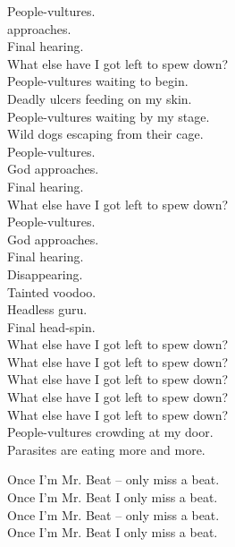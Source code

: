 


People-vultures. \\
 approaches. \\
Final hearing. \\
What else have I got left to spew down? \\

People-vultures waiting to begin. \\
Deadly ulcers feeding on my skin. \\

People-vultures waiting by my stage. \\
Wild dogs escaping from their cage. \\

People-vultures. \\
God approaches. \\
Final hearing. \\
What else have I got left to spew down? \\

People-vultures. \\
God approaches. \\
Final hearing. \\
Disappearing. \\
Tainted voodoo. \\
Headless guru. \\
Final head-spin. \\

What else have I got left to spew down? \\
What else have I got left to spew down? \\
What else have I got left to spew down? \\
What else have I got left to spew down? \\
What else have I got left to spew down? \\

People-vultures crowding at my door. \\
Parasites are eating more and more. \\




Once I'm Mr. Beat -- only miss a beat. \\
Once I'm Mr. Beat I only miss a beat. \\
Once I'm Mr. Beat -- only miss a beat. \\
Once I'm Mr. Beat I only miss a beat. \\


